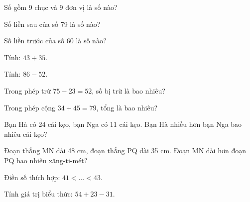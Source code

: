 \begin{ex}
Số gồm 9 chục và 9 đơn vị là số nào?
\end{ex}

\begin{ex}
Số liền sau của số 79 là số nào?
\end{ex}

\begin{ex}
Số liền trước của số 60 là số nào?
\end{ex}

\begin{ex}
Tính: $43 + 35$.
\end{ex}

\begin{ex}
Tính: $86 - 52$.
\end{ex}

\begin{ex}
Trong phép trừ $75 - 23 = 52$, số bị trừ là bao nhiêu?
\end{ex}

\begin{ex}
Trong phép cộng $34 + 45 = 79$, tổng là bao nhiêu?
\end{ex}

\begin{ex}
Bạn Hà có 24 cái kẹo, bạn Nga có 11 cái kẹo. Bạn Hà nhiều hơn bạn Nga bao nhiêu cái kẹo?
\end{ex}

\begin{ex}
Đoạn thẳng MN dài 48 cm, đoạn thẳng PQ dài 35 cm. Đoạn MN dài hơn đoạn PQ bao nhiêu xăng-ti-mét?
\end{ex}

\begin{ex}
Điền số thích hợp: $41 < \dots < 43$.
\end{ex}

\begin{ex}
Tính giá trị biểu thức: $54 + 23 - 31$.
\end{ex}

